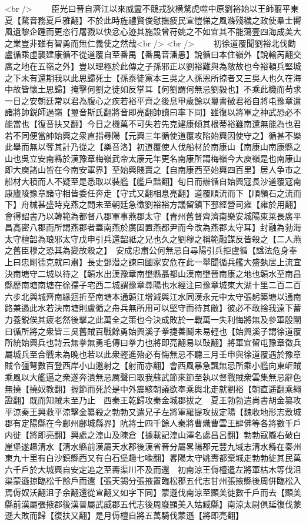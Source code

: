<br />
　　臣光曰晉自濟江以來威靈不競戎狄横騖虎噬中原劉裕始以王師翦平東夏【騖音務夏戶雅翻】不於此時旌禮賢俊慰撫疲民宣愷悌之風滌殘穢之政使羣士嚮風遺黎企踵而更恣行屠戮以快忿心迹其施設曾苻姚之不如宜其不能蕩壹四海成美大之業豈非雖有智勇而無仁義使之然哉<br />
<br />
　　初徐道覆聞劉裕北伐勸盧循乘虛襲建康循不從道覆自至番禺【番禺音潘愚】說循曰本住嶺外【說輸芮翻交廣之地在五嶺之外】豈以理極於此傳之子孫邪正以劉裕難與為敵故也今裕頓兵堅城之下未有還期我以此思歸死士【孫泰徒黨本三吳之人孫恩所掠者又三吳人也久在海中故皆懷土思歸】掩擊何劉之徒如反掌耳【何劉謂何無忌劉毅也】不乘此機而苟求一日之安朝廷常以君為腹心之疾若裕平齊之後息甲歲餘以璽書徵君裕自將屯豫章遣諸將帥鋭師過嶺【璽音斯氏翻將音即亮翻帥讀曰率下同】雖復以將軍之神武恐必不能當也【復音扶又翻】今日之機萬不可失若先克建康傾其根蒂裕雖南還無能為也君若不同便當帥始興之衆直指尋陽【元興三年循使道覆攻陷始興因使守之】循甚不樂此舉而無以奪其計乃從之【樂音洛】初道覆使人伐船材於南康山【南康山南康縣之山也吳立安南縣於漢豫章梅嶺武帝太康元年更名南康所謂梅嶺今大庾嶺是也南康山即大庾諸山皆在今南安軍界】至始興賤賣之【自南康西至始興四百里】居人争市之船材大積而人不疑至是悉取以裝艦【艦戶黯翻】旬日而辦循自始興寇長沙道覆寇南康廬陵豫章諸守相皆委任奔走【守式又翻相息亮翻】道覆順流而下【順贑石之流而下】舟械甚盛時克燕之問未至朝廷急徵劉裕裕方議留鎮下邳經營司雍【雍於用翻】會得詔書乃以韓範為都督八郡軍事燕郡太守【青州舊督齊濟南樂安城陽東莱長廣平昌高密八郡而所謂燕郡者蓋南燕於廣固置燕都尹而今改為燕郡太守耳】封融為勃海太守檀韶為琅邪太守戊申引兵還韶祗之兄也久之劉穆之稱範融謀反皆殺之【二人燕之舊臣穆之恐其為變故殺之】　安成忠肅公何無忌自尋陽引兵拒盧循【諡法危身奉上曰忠剛德克就曰肅】長史鄧潜之諫曰國家安危在此一舉聞循兵艦大盛埶居上流宜決南塘守二城以待之【贑水出漢豫章南壄縣聶都山漢南壄晉南康之地也贑水至南昌縣歷南塘南塘在徐孺子宅西二城謂豫章尋陽也水經注曰豫章城東大湖十里二百二百六步北與城齊南緣迴折至南塘本通贑江增減與江水同漢永元中太守張躬築塘以通南路兼遏此水若決南塘則盧循之舟兵無所用可以堅守而待其敝】彼必不敢捨我遠下蓄力養鋭俟其疲老然後擊之此萬全之策也今決成敗於一戰萬一失利悔將無及參軍殷闡曰循所將之衆皆三吳舊賊百戰餘勇始興溪子拳捷善鬭未易輕也【始興溪子謂徐道覆所統始興兵也詩云無拳無勇毛傳曰拳力也將即亮翻易以䜴翻】將軍宜留屯豫章徵兵屬城兵至合戰未為晚也若以此衆輕進殆必有悔無忌不聽三月壬申與徐道覆遇於豫章賊令彊弩數百登西岸小山邀射之【射而亦翻】會西風暴急飄無忌所乘小艦向東㟁賊乘風以大艦逼之衆遂奔潰無忌厲聲曰取我蘇武節來節至執以督戰賊衆雲集無忌辭色無撓【撓奴教翻】握節而死於是中外震駭朝議欲奉乘輿北走就劉裕【朝直遥翻乘繩證翻】既而知賊未至乃止　西秦王乾歸攻秦金城郡拔之　夏王勃勃遣尚書胡金纂攻平涼秦王興救平涼擊金纂殺之勃勃又遣兄子左將軍羅提攻拔定陽【魏收地形志敷城郡有定陽縣在今鄜州鄜城縣界】阬將士四千餘人秦將曹熾曹雲王肆佛等各將數千戶内徙【將即亮翻】興處之湟山及陳倉【據載記湟山澤名處昌呂翻】勃勃寇隴右破白崖堡遂趣清水【清水縣前漢屬天水郡後漢省晉分屬畧陽郡元豐九域志清水縣在秦州東九十里有白沙鎮縣西又有白石堡趣七喩翻】畧陽太守姚夀都棄城走勃勃徙其民萬六千戶於大城興自安定追之至夀渠川不及而還　初南涼王傉檀遣左將軍枯木等伐沮渠蒙遜掠臨松千餘戶而還【張天錫分張掖置臨松郡五代志甘州張掖縣後周併臨松入焉傉奴沃翻沮子余翻還從宣翻又如字下同】蒙遜伐南涼至顯美徙數千戶而去【顯美縣前漢屬張掖郡後漢晉屬武威郡五代志後周廢顯美入姑臧縣】南涼太尉俱延復伐蒙遜大敗而歸【復扶又翻】是月傉檀自將五萬騎伐蒙遜【將即亮翻】